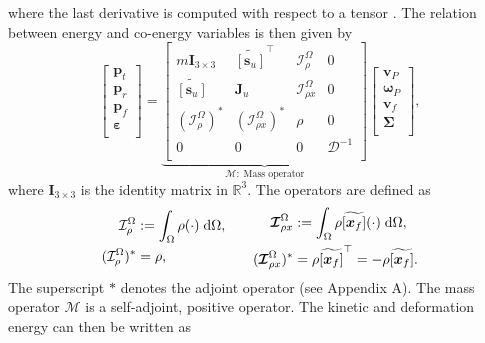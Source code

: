 \documentclass{svjour3}                     %
\newcommand{\crmat}[1]{\ensuremath{\widetilde{\left[#1\right]}}}
\begin{document}
where the last derivative is computed with respect to a tensor \cite{BRUGNOLI2019940}.
The relation between energy and co-energy variables is then given by
\begin{equation}
\label{eq:mass_op}
\begin{bmatrix}
\bm{p}_t \\ \bm{p}_r \\ \bm{p}_f \\ \bm\varepsilon \\
\end{bmatrix} = 
\underbrace{\begin{bmatrix}
	m \bm{I}_{3\times 3} & \crmat{\bm{s}_u}^\top & \mathcal{I}_\rho^{\Omega} & 0 \\
	\crmat{\bm{s}_u} & \bm{J}_u & \bm{\mathcal{I}}_{\rho x}^{\Omega} & 0  \\
	(\mathcal{I}_\rho^{\Omega})^* & (\bm{\mathcal{I}}_{\rho x}^{\Omega})^* & \rho & 0  \\
	0 & 0 & 0 & \bm{\mathcal{D}}^{-1} \\
	\end{bmatrix}}_{\bm{\mathcal{M}}: \; \text{Mass operator}}
\begin{bmatrix}
\bm{v}_P \\ \bm{\omega}_P  \\ \bm{v}_f  \\ \bm\Sigma \\
\end{bmatrix},
\end{equation}
where $\bm{I}_{3\times 3}$ is the identity matrix in $\mathbb{R}^3$. The operators are defined as
\begin{equation*}
\begin{aligned}
\mathcal{I}_\rho^\Omega &:=\int_{\Omega} \rho (\cdot) \d{\Omega}, \\
(\mathcal{I}_\rho^{\Omega})^* &= \rho, \\
\end{aligned} \qquad
\begin{aligned} 
\bm{\mathcal{I}}_{\rho x}^{\Omega} &:= \int_\Omega \rho \crmat{\bm{x}_f} (\cdot) \d{\Omega}, \\
(\bm{\mathcal{I}}_{\rho x}^{\Omega})^* &= \rho \crmat{\bm{x}_f}^\top= -\rho \crmat{\bm{x}_f}. \\
\end{aligned}
\end{equation*}
The superscript $*$ denotes the adjoint operator (see Appendix A). The mass operator $\bm{\mathcal{M}}$ is a self-adjoint, positive operator. The kinetic and deformation energy can then be written as
\end{document}
